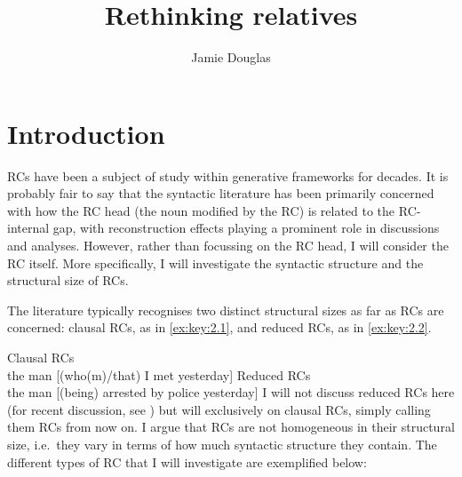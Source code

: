 \documentclass[output=paper]{langsci/langscibook}
\author{Jamie Douglas\affiliation{University of Cambridge}}
\title{Rethinking relatives}
\begin{document}
\glsresetall

\section{Introduction}\label{sec:key:02.1}

\Glspl{RC} have been a subject of study within generative frameworks for
decades. It is probably fair to say that the syntactic literature has been
primarily concerned with how the \gls{RC} head (the noun
modified by the RC) is related to the RC-internal gap, with reconstruction
effects playing a prominent role in discussions and analyses. However, rather
than focussing on the \gls{RC} head, I will consider the \gls{RC} itself.  More specifically, I will investigate the syntactic structure
and the structural size of  \glspl{RC}.

The literature typically recognises two distinct structural sizes as far as RCs
are concerned: clausal RCs, as in \eqref{ex:key:2.1}, and reduced RCs, as in \eqref{ex:key:2.2}.

\ea\label{ex:key:2.1} Clausal RCs\\
    the man [(who(m)/that) I met yesterday]
\z
\ea\label{ex:key:2.2} Reduced RCs\\
    the man [(being) arrested by police yesterday]
\z
I will not discuss reduced \glspl{RC} here (for recent discussion, see
\citealt{Douglas2016,Harwood2017}) but will  exclusively on clausal RCs,
simply calling them \glspl{RC} from now on. I argue that \glspl{RC} are not
homogeneous in their structural size, i.e.\ they vary in terms of how much
syntactic structure they contain. The different types of \gls{RC} that I will
investigate are exemplified below:
\end{document}
